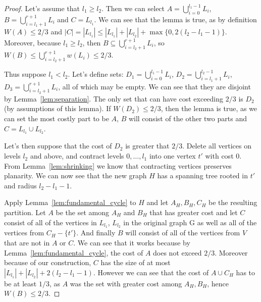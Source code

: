 \begin{proof}
    Let's assume that $l_1 \geq l_2$. Then we can select $A =
    \bigcup_{i=0}^{l_1-1} L_i$, $B = \bigcup_{i=l_1+1}^{r+1} L_i$ and $C =
    L_{l_1}$. We can see that the lemma is true, as by definition $W(A) \leq 2/3$  
    and $|C| = |L_{l_1}| \leq |L_{l_1}| + |L_{l_2}| + \max \{ 0, 2(l_2 - l_1 - 1) \}$.
    Moreover, because $l_1 \geq l_2$, then $B \subseteq
    \bigcup_{i=l_2+1}^{r+1} L_i$, so $W(B) \leq \bigcup_{i = l_2 + 1}^{r+1} w(L_i) \leq 2/3$.
    
    Thus suppose $l_1 < l_2$.
    Let's define sets: $D_1 =
    \bigcup_{i=0}^{l_1-1} L_i$, $D_2 = \bigcup_{i=l_1 + 1}^{l_2-1} L_i$, $D_3 =
    \bigcup_{i=l_2 + 1}^{r+1} L_i$, all of which may be empty. We can see that
    they are disjoint by Lemma~\ref{lem:separation}. The only set that
    can have cost exceeding $2/3$ is $D_2$ (by assumptions of this lemma). If
    $W(D_2) \leq 2/3$, then the lemma is true, as we can set
    the most costly part to be $A$, $B$ will consist of the other two parts
    and $C = L_{l_1} \cup L_{l_2}$.
    
    Let's then suppose that the cost of $D_2$ is greater that $2/3$. Delete
    all vertices on levels $l_2$ and above, and contract levels $0, \dots,
    l_1$ into one vertex $t'$ with cost 0. From Lemma~\ref{lem:shrinking} we know that contracting
    vertices preserves planarity. We can now see that the new graph $H$ has a
    spanning tree rooted in $t'$ and radius $l_2 - l_1 - 1$.

    Apply Lemma~\ref{lem:fundamental_cycle} to $H$ and let $A_H, B_H, C_H$ be the resulting
    partition. Let $A$ be the set among $A_H$ and $B_H$ that has greater cost
    and let $C$ consist of all of the vertices in $L_{l_1}$, $L_{l_2}$ in the
    original graph G as well as all of the vertices from $C_H - \{ t' \}$. And finally
    $B$ will consist of all of the vertices from $V$ that are not in $A$ or $C$. We
    can see that it works because by Lemma~\ref{lem:fundamental_cycle}, the cost
    of $A$ does not exceed $2/3$. Moreover because of our construction, $C$ has
    the size of at most $|L_{l_1}| + |L_{l_2}| + 2(l_2 - l_1 - 1)$. However we can see
    that the cost of $A \cup C_H$ has to be at least $1/3$, as $A$ was the set
    with greater cost among $A_H, B_H$, hence $W(B) \leq 2/3$.
\end{proof}

